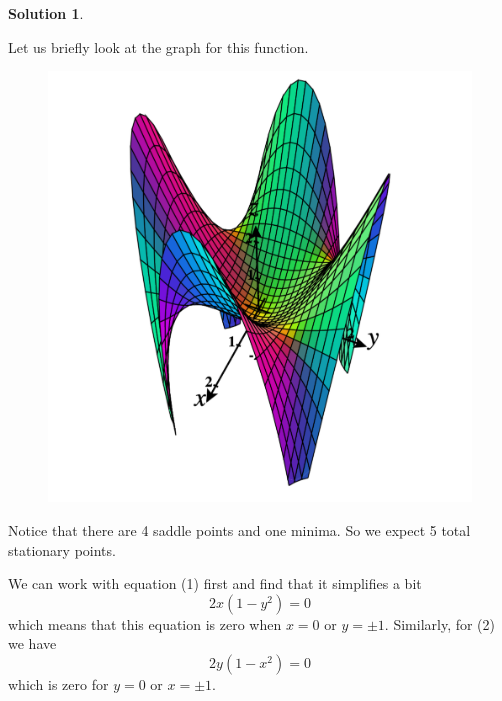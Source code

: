 \documentclass[12pt]{report} %
\theoremstyle{definition}
\newtheorem{solution}{Solution}
\begin{document}
\begin{solution}
\begin{enumerate}[(a)]
    Let us briefly look at the graph for this function.
    \begin{figure}[H]
        \centering
        \includegraphics[width=.6\textwidth]{Images/stationary_point_surface.png}
    \end{figure}
    Notice that there are 4 saddle points and one minima.  So we expect 5 total stationary points.
\end{enumerate}
We can work with equation (1) first and find that it simplifies a bit
\[
2x(1-y^2)=0
\]
which means that this equation is zero when $x=0$ or $y=\pm 1$. Similarly, for (2) we have
\[
2y(1-x^2)=0
\]
which is zero for $y=0$ or $x=\pm 1$.


\end{solution}
\end{document}
